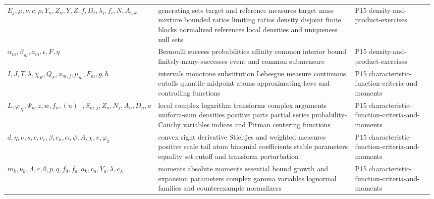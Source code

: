 \begin{longtable}{@{}p{}p{}p{}@{}}
\(E_j,\allowbreak \mu,\allowbreak \nu,\allowbreak c,\allowbreak \rho,\allowbreak Y_n,\allowbreak Z_n,\allowbreak Y,\allowbreak Z,\allowbreak f,\allowbreak D_i,\allowbreak \lambda_i,\allowbreak f_i,\allowbreak N,\allowbreak A_{i,k}\) & generating sets target and reference measures target mass mixture bounded ratios limiting ratios density disjoint finite blocks normalized references local densities and uniqueness null sets & P15 density-\allowbreak{}and-\allowbreak{}product-\allowbreak{}exercises \\
\(\alpha_m,\allowbreak \beta_m,\allowbreak a_m,\allowbreak \epsilon,\allowbreak F,\allowbreak \eta\) & Bernoulli success probabilities affinity common interior bound finitely-many-successes event and common submeasure & P15 density-\allowbreak{}and-\allowbreak{}product-\allowbreak{}exercises \\
\(I,\allowbreak J,\allowbreak T,\allowbreak \lambda,\allowbreak \chi_R,\allowbreak Q_F,\allowbreak x_{m,j},\allowbreak \mu_m,\allowbreak F_m,\allowbreak g,\allowbreak h\) & intervals monotone substitution Lebesgue measure continuous cutoffs quantile midpoint atoms approximating laws and controlling functions & P15 characteristic-\allowbreak{}function-\allowbreak{}criteria-\allowbreak{}and-\allowbreak{}moments \\
\(L,\allowbreak \varphi_X,\allowbreak \Psi_n,\allowbreak z,\allowbreak w,\allowbreak f_n,\allowbreak (u)_+,\allowbreak S_{m,j},\allowbreak Z_n,\allowbreak N_j,\allowbreak A_n,\allowbreak D_n,\allowbreak a\) & local complex logarithm transforms complex arguments uniform-sum densities positive parts partial series probability-Cauchy variables indices and Pitman centering functions & P15 characteristic-\allowbreak{}function-\allowbreak{}criteria-\allowbreak{}and-\allowbreak{}moments \\
\(d,\allowbreak \eta,\allowbreak \nu,\allowbreak s,\allowbreak c,\allowbreak \nu_c,\allowbreak \beta,\allowbreak c_n,\allowbreak \alpha,\allowbreak \psi,\allowbreak A,\allowbreak \chi,\allowbreak v,\allowbreak \varphi_2\) & convex right derivative Stieltjes and weighted measures positive scale tail atom binomial coefficients stable parameters equality set cutoff and transform perturbation & P15 characteristic-\allowbreak{}function-\allowbreak{}criteria-\allowbreak{}and-\allowbreak{}moments \\
\(m_k,\allowbreak \nu_k,\allowbreak \Lambda,\allowbreak r,\allowbreak \theta,\allowbreak p,\allowbreak q,\allowbreak f_0,\allowbreak f_a,\allowbreak a_k,\allowbreak c_a,\allowbreak Y_a,\allowbreak \lambda,\allowbreak c_\lambda\) & moments absolute moments essential bound growth and expansion parameters complex gamma variables lognormal families and counterexample normalizers & P15 characteristic-\allowbreak{}function-\allowbreak{}criteria-\allowbreak{}and-\allowbreak{}moments \\

\end{longtable}
